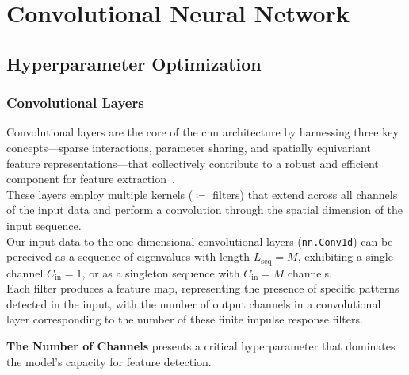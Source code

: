 \section{Convolutional Neural Network}
\label{sec:cnn}
\subsection{Hyperparameter Optimization}

\subsubsection{Convolutional Layers}

Convolutional layers are the core of the \gls{cnn} architecture by harnessing three key concepts—sparse interactions,
parameter sharing, and spatially equivariant feature representations—that collectively contribute to a robust and efficient
component for feature extraction~\cite[Chapter 9]{dlbook}. \\
These layers employ multiple kernels (\( \coloneqq \) filters) that extend across all channels of the input data and perform
a convolution through the spatial dimension of the input sequence. \\
Our input data to the one-dimensional convolutional layers (\texttt{nn.Conv1d}) can be perceived as a
sequence of eigenvalues with length \(  L_{\text{seq}} = M \), exhibiting a single channel \( C_{\text{in}} = 1\), or
as a singleton sequence with \( C_{\text{in}} = M \) channels. \\
Each filter produces a feature map, representing the presence of specific patterns detected in the input, with the number
of output channels in a convolutional layer corresponding to the number of these finite impulse response filters.

\textbf{The Number of Channels} presents a critical hyperparameter that dominates the model's capacity for feature detection.

